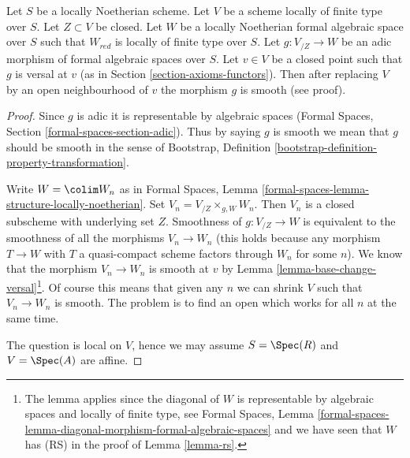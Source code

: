 \begin{lemma}
\label{lemma-openness-smoothness}
Let $S$ be a locally Noetherian scheme. Let $V$ be a scheme locally
of finite type over $S$. Let $Z \subset V$ be closed. Let $W$ be
a locally Noetherian formal algebraic space over $S$ such that
$W_{red}$ is locally of finite type over $S$. Let $g : V_{/Z} \to W$
be an adic morphism of formal algebraic spaces over $S$. Let $v \in V$
be a closed point such that $g$ is versal at $v$ (as in
Section \ref{section-axioms-functors}).
Then after replacing $V$ by an open neighbourhood of $v$ the
morphism $g$ is smooth (see proof).
\end{lemma}

\begin{proof}
Since $g$ is adic it is representable by algebraic spaces (Formal Spaces,
Section \ref{formal-spaces-section-adic}).
Thus by saying $g$ is smooth we mean that $g$ should be smooth
in the sense of
Bootstrap, Definition \ref{bootstrap-definition-property-transformation}.

\medskip\noindent
Write $W = \colim W_n$ as in Formal Spaces, Lemma
\ref{formal-spaces-lemma-structure-locally-noetherian}.
Set $V_n = V_{/Z} \times_{g, W} W_n$.
Then $V_n$ is a closed subscheme with underlying set $Z$.
Smoothness of $g : V_{/Z} \to W$ is equivalent to the smoothness
of all the morphisms $V_n \to W_n$ (this holds because any morphism
$T \to W$ with $T$ a quasi-compact scheme factors through
$W_n$ for some $n$). We know that the morphism $V_n \to W_n$
is smooth at $v$ by
Lemma \ref{lemma-base-change-versal}\footnote{The lemma applies since
the diagonal of $W$ is representable by algebraic spaces and
locally of finite type, see Formal Spaces, Lemma
\ref{formal-spaces-lemma-diagonal-morphism-formal-algebraic-spaces}
and we have seen that $W$ has (RS) in the proof of Lemma \ref{lemma-rs}.}.
Of course this means that given any $n$ we can shrink $V$
such that $V_n \to W_n$ is smooth. The problem is to find
an open which works for all $n$ at the same time.

\medskip\noindent
The question is local on $V$, hence we may assume $S = \Spec(R)$ and
$V = \Spec(A)$ are affine.


\end{proof}
